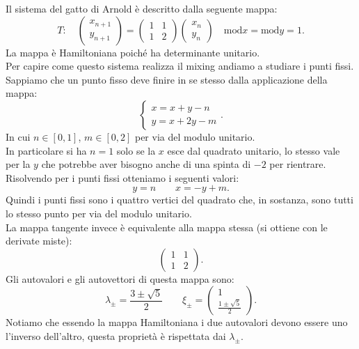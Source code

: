 \begin{exmp}
    Il sistema del gatto di Arnold è descritto dalla seguente mappa:
    \[
        T: \quad
	\begin{pmatrix} x_{n+1} \\ y_{n+1} \end{pmatrix}  = 
	\begin{pmatrix} 
	    1 & 1 \\
	    1 & 2
	\end{pmatrix} 
	\begin{pmatrix} x_n \\ y_n \end{pmatrix} 
	\quad \text{mod}x = \text{mod}y = 1
    .\]
    La mappa è Hamiltoniana poiché ha determinante unitario. \\
    Per capire come questo sistema realizza il mixing andiamo a studiare i punti fissi. Sappiamo che un punto fisso deve finire in se stesso dalla applicazione della mappa:
    \[
        \begin{cases}
            x = x+y -n \\
	    y = x + 2y - m
        \end{cases}
    .\] 
    In cui $n \in \left[0,1\right]$, $m \in \left[0,2\right]$ per via del modulo unitario.\\
    In particolare si ha $n=1$ solo se la $x$ esce dal quadrato unitario, lo stesso vale per la $y$ che potrebbe aver bisogno anche di una spinta di $-2$ per rientrare.\\
    Risolvendo per i punti fissi otteniamo i seguenti valori:
    \[
        y = n \qquad x = - y + m
    .\] 
    Quindi i punti fissi sono i quattro vertici del quadrato che, in sostanza, sono tutti lo stesso punto per via del modulo unitario.\\
    La mappa tangente invece è equivalente alla mappa stessa (si ottiene con le derivate miste):
    \[
        \begin{pmatrix} 
	    1 & 1 \\
	    1 & 2
	\end{pmatrix} 
    .\] 
    Gli autovalori e gli autovettori di questa mappa sono:
    \[
        \lambda_{\pm}= \frac{3 \pm \sqrt{5} }{2} \qquad
	\xi_{\pm} = \begin{pmatrix} 1 \\ \frac{1 \pm \sqrt{5} }{2} \end{pmatrix} 
    .\] 
    Notiamo che essendo la mappa Hamiltoniana i due autovalori devono essere uno l'inverso dell'altro, questa proprietà è rispettata dai $\lambda_{\pm}$.\\

\end{exmp}
